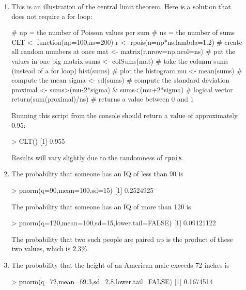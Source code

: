 \begin{enumerate}

\item This is an illustration of the central limit theorem. Here is a
  solution that does not require a for loop:

\begin{script}
# np = the number of Poisson values per sum
# ns = the number of sums
CLT <- function(np=100,ns=200){
  r <- rpois(n=np*ns,lambda=1.2)   # create all random numbers at once
  mat <- matrix(r,nrow=np,ncol=ns) # put the values in one big matrix
  sums <- colSums(mat)  # take the column sums (instead of a for loop)
  hist(sums)            # plot the histogram
  mu <- mean(sums)      # compute the mean
  sigma <- sd(sums)     # compute the standard deviation
  proximal <- sums>(mu-2*sigma) & sums<(mu+2*sigma) # logical vector
  return(sum(proximal)/ns)         # returns a value between 0 and 1
}
\end{script}

Running this script from the console should return a value of
approximately 0.95:

\begin{console}
> CLT()
[1] 0.955
\end{console}

Results will vary slightly due to the randomness of \texttt{rpois}.

\item The probability that someone has an IQ of less than 90 is

\begin{console}
> pnorm(q=90,mean=100,sd=15)
[1] 0.2524925
\end{console}

The probability that someone has an IQ of more than 120 is

\begin{console}
> pnorm(q=120,mean=100,sd=15,lower.tail=FALSE)
[1] 0.09121122
\end{console}

The probability that two such people are paired up is the product
of these two values, which is 2.3\%.
  
\item The probability that the height of an American male exceeds
  72 inches is

\begin{console}
> pnorm(q=72,mean=69.3,sd=2.8,lower.tail=FALSE)
[1] 0.1674514
\end{console}


\end{enumerate}
